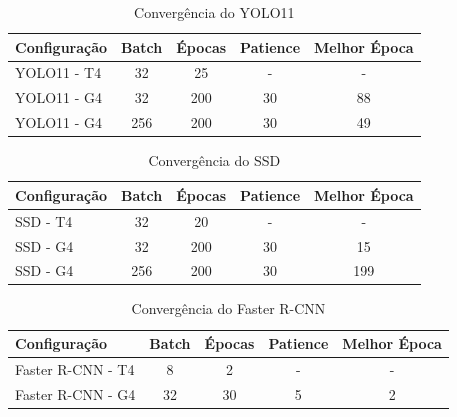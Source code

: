 \begin{table}[H]
    \caption{Convergência do YOLO11}
    \label{tab:convergencia-yolo11}
    \centering
    \small
    \begin{tabular}{lcccc}
        \toprule
        \textbf{Configuração} & \textbf{Batch} & \textbf{Épocas} & \textbf{Patience} & \textbf{Melhor Época} \\
        \midrule
        YOLO11 - T4 & 32  & 25  & -  & -  \\
        YOLO11 - G4 & 32  & 200 & 30 & 88 \\
        YOLO11 - G4 & 256 & 200 & 30 & 49 \\
        \bottomrule
    \end{tabular}
\end{table}
\vspace{-1em}

\begin{table}[H]
    \caption{Convergência do SSD}
    \label{tab:convergencia-ssd}
    \centering
    \small
    \begin{tabular}{lcccc}
        \toprule
        \textbf{Configuração} & \textbf{Batch} & \textbf{Épocas} & \textbf{Patience} & \textbf{Melhor Época} \\
        \midrule
        SSD - T4 & 32  & 20  & -  & -   \\
        SSD - G4 & 32  & 200 & 30 & 15  \\
        SSD - G4 & 256 & 200 & 30 & 199 \\
        \bottomrule
    \end{tabular}
\end{table}
\vspace{-1em}

\begin{table}[H]
    \caption{Convergência do Faster R-CNN}
    \label{tab:convergencia-faster-rcnn}
    \centering
    \small
    \begin{tabular}{lcccc}
        \toprule
        \textbf{Configuração} & \textbf{Batch} & \textbf{Épocas} & \textbf{Patience} & \textbf{Melhor Época} \\
        \midrule
        Faster R-CNN - T4 & 8  & 2  & - & - \\
        Faster R-CNN - G4 & 32 & 30 & 5 & 2 \\
        \bottomrule
    \end{tabular}
\end{table}
\vspace{-1em}


